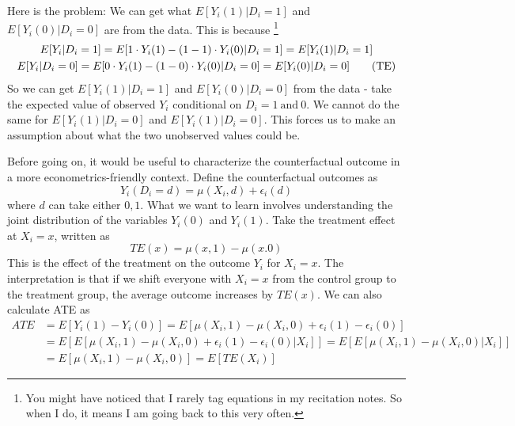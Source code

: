 Here is the problem: We can get what $E[Y_i(1)|D_i=1]$ and $E[Y_i(0)|D_i=0]$ are from the data. This is because \footnote{You might have noticed that I rarely tag equations in my recitation notes. So when I do, it means I am going back to this very often. }
\begin{gather*}
E[Y_i|D_i=1]=E[1\cdot Y_i(1)-(1-1)\cdot Y_i(0)|D_i=1]=E[Y_i(1)|D_i=1]\\
E[Y_i|D_i=0]=E[0\cdot Y_i(1)-(1-0)\cdot Y_i(0)|D_i=0]=E[Y_i(0)|D_i=0] \tag{\text{TE}}\label{TE}
\end{gather*}
So we can get $E[Y_i(1)|D_i=1]$ and $E[Y_i(0)|D_i=0]$ from the data - take the expected value of observed $Y_i$ conditional on $D_i=1 \ \text{and}\ 0$. We cannot do the same for $E[Y_i(1)|D_i=0]$ and $E[Y_i(1)|D_i=0]$. This forces us to make an assumption about what the two unobserved values could be. \par
Before going on, it would be useful to characterize the counterfactual outcome in a more econometrics-friendly context. Define the counterfactual outcomes as
\[
Y_i(D_i=d)=\mu(X_i,d)+\epsilon_i(d)
\]
where $d$ can take either $0, 1$. What we want to learn involves understanding the joint distribution of the variables $Y_i(0)$ and $Y_i(1)$. Take the treatment effect at $X_i=x$, written as
\[
TE(x)=\mu(x,1)-\mu(x.0)
\]
This is the effect of the treatment on the outcome $Y_i$ for $X_i=x$. The interpretation is that if we shift everyone with $X_i=x$ from the control group to the treatment group, the average outcome increases by $TE(x)$. We can also calculate ATE as
\begin{align*}
ATE&=E[Y_i(1)-Y_i(0)]=E[\mu(X_i,1)-\mu(X_i,0)+\epsilon_i(1)-\epsilon_i(0)]\\
&=E\left[E[\mu(X_i,1)-\mu(X_i,0)+\epsilon_i(1)-\epsilon_i(0)|X_i]\right]=E\left[E[\mu(X_i,1)-\mu(X_i,0)|X_i]\right]\\
&=E[\mu(X_i,1)-\mu(X_i,0)]=E[TE(X_i)]
\end{align*}
